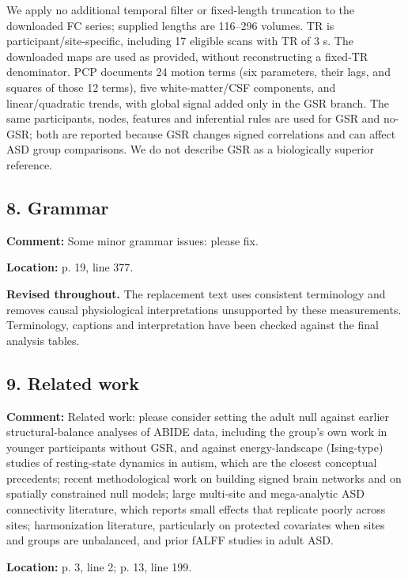 \documentclass[11pt]{article}
\begin{document}
We apply no additional temporal filter or fixed-length truncation to the downloaded FC series; supplied lengths are 116--296 volumes. TR is participant/site-specific, including 17 eligible scans with TR of 3 s. The downloaded maps are used as provided, without reconstructing a fixed-TR denominator. PCP documents 24 motion terms (six parameters, their lags, and squares of those 12 terms), five white-matter/CSF components, and linear/quadratic trends, with global signal added only in the GSR branch. The same participants, nodes, features and inferential rules are used for GSR and no-GSR; both are reported because GSR changes signed correlations and can affect ASD group comparisons. We do not describe GSR as a biologically superior reference.


\subsection*{8. Grammar}

\textbf{Comment:} Some minor grammar issues: please fix.


\textbf{Location:} p. 19, line 377.


 \textbf{Revised throughout.} The replacement text uses consistent terminology and removes causal physiological interpretations unsupported by these measurements. Terminology, captions and interpretation have been checked against the final analysis tables.


\subsection*{9. Related work}

\textbf{Comment:} Related work: please consider setting the adult null against earlier structural-balance analyses of ABIDE data, including the group’s own work in younger participants without GSR, and against energy-landscape (Ising-type) studies of resting-state dynamics in autism, which are the closest conceptual precedents; recent methodological work on building signed brain networks and on spatially constrained null models; large multi-site and mega-analytic ASD connectivity literature, which reports small effects that replicate poorly across sites; harmonization literature, particularly on protected covariates when sites and groups are unbalanced, and prior fALFF studies in adult ASD.


\textbf{Location:} p. 3, line 2; p. 13, line 199.
\end{document}
